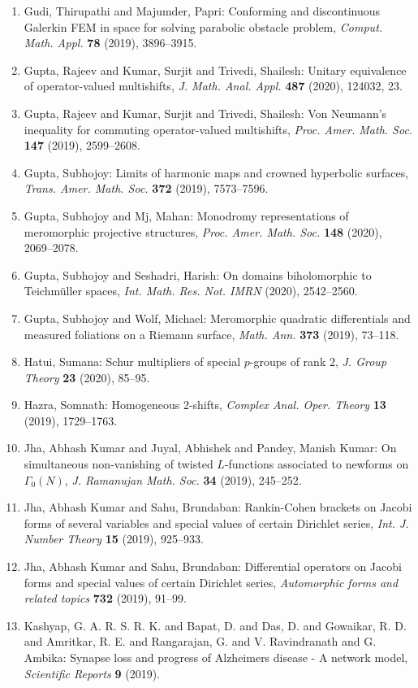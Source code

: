 \begin{enumerate}
\item Gudi, Thirupathi and Majumder, Papri: Conforming and discontinuous {G}alerkin {FEM} in space for
solving parabolic obstacle problem, \emph{Comput. Math. Appl.} {\bf 78} (2019), 3896--3915.
\item Gupta, Rajeev and Kumar, Surjit and Trivedi, Shailesh: Unitary equivalence of operator-valued multishifts, \emph{J. Math. Anal. Appl.} {\bf 487} (2020), 124032, 23.
\item Gupta, Rajeev and Kumar, Surjit and Trivedi, Shailesh: Von {N}eumann's inequality for commuting operator-valued
multishifts, \emph{Proc. Amer. Math. Soc.} {\bf 147} (2019), 2599--2608.
\item Gupta, Subhojoy: Limits of harmonic maps and crowned hyperbolic surfaces, \emph{Trans. Amer. Math. Soc.} {\bf 372} (2019), 7573--7596.
\item Gupta, Subhojoy and Mj, Mahan: Monodromy representations of meromorphic projective
structures, \emph{Proc. Amer. Math. Soc.} {\bf 148} (2020), 2069--2078.
\item Gupta, Subhojoy and Seshadri, Harish: On domains biholomorphic to {T}eichm\"{u}ller spaces, \emph{Int. Math. Res. Not. IMRN} {\bf } (2020), 2542--2560.
\item Gupta, Subhojoy and Wolf, Michael: Meromorphic quadratic differentials and measured foliations on
a {R}iemann surface, \emph{Math. Ann.} {\bf 373} (2019), 73--118.
\item Hatui, Sumana: Schur multipliers of special {$p$}-groups of rank 2, \emph{J. Group Theory} {\bf 23} (2020), 85--95.
\item Hazra, Somnath: Homogeneous 2-shifts, \emph{Complex Anal. Oper. Theory} {\bf 13} (2019), 1729--1763.
\item Jha, Abhash Kumar and Juyal, Abhishek and Pandey, Manish
Kumar: On simultaneous non-vanishing of twisted {$L$}-functions
associated to newforms on {$\Gamma_0(N)$}, \emph{J. Ramanujan Math. Soc.} {\bf 34} (2019), 245--252.
\item Jha, Abhash Kumar and Sahu, Brundaban: Rankin-{C}ohen brackets on {J}acobi forms of several variables
and special values of certain {D}irichlet series, \emph{Int. J. Number Theory} {\bf 15} (2019), 925--933.
\item Jha, Abhash Kumar and Sahu, Brundaban: Differential operators on {J}acobi forms and special values of
certain {D}irichlet series, \emph{Automorphic forms and related topics} {\bf 732} (2019), 91--99.
\item Kashyap, G. A. R. S. R. K. and Bapat, D. and Das, D. and Gowaikar, R. D. and  Amritkar, R. E. and Rangarajan, G. and V. Ravindranath and G. Ambika: Synapse loss and progress of Alzheimers disease - A network model, \emph{Scientific Reports} {\bf 9} (2019).

\end{enumerate}
